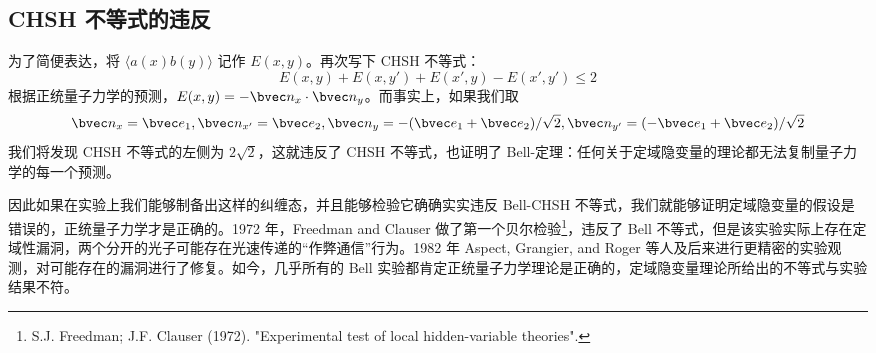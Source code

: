\subsection{CHSH 不等式的违反}
为了简便表达，将 $\langle a(x)b(y)\rangle$ 记作 $E(x,y)$。再次写下 CHSH 不等式：
\begin{equation}
E(x,y)+E(x,y')+E(x',y)-E(x',y')\le 2
\end{equation}
根据正统量子力学的预测，$E(x,y)=-\bvec n_x\cdot \bvec n_y$。而事实上，如果我们取
\begin{equation}
\bvec n_x=\bvec e_1,
\bvec n_{x'}=\bvec e_2,
\bvec n_y=-(\bvec e_1+\bvec e_2)/\sqrt{2},
\bvec n_{y'}=(-\bvec e_1+\bvec e_2)/\sqrt{2}
\end{equation}
我们将发现 CHSH 不等式的左侧为 $2\sqrt{2}$，这就违反了 CHSH 不等式，也证明了 Bell-定理：任何关于定域隐变量的理论都无法复制量子力学的每一个预测。

因此如果在实验上我们能够制备出这样的纠缠态，并且能够检验它确确实实违反 Bell-CHSH 不等式，我们就能够证明定域隐变量的假设是错误的，正统量子力学才是正确的。1972 年，Freedman and Clauser 做了第一个贝尔检验\footnote{S.J. Freedman; J.F. Clauser (1972). "Experimental test of local hidden-variable theories".}，违反了 Bell 不等式，但是该实验实际上存在定域性漏洞，两个分开的光子可能存在光速传递的“作弊通信”行为。1982 年 Aspect, Grangier, and Roger 等人及后来进行更精密的实验观测，对可能存在的漏洞进行了修复。如今，几乎所有的 Bell 实验都肯定正统量子力学理论是正确的，定域隐变量理论所给出的不等式与实验结果不符。